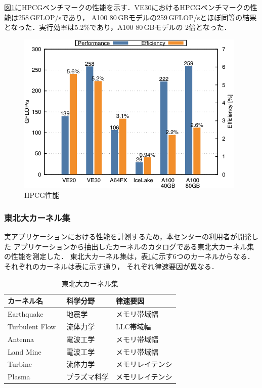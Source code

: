 ﻿\documentclass[submit,techrep,noauthor]{ipsj}
\begin{document}
図\ref{fig:hpcg}にHPCGベンチマークの性能を示す．VE30におけるHPCGベンチマークの性能は258\,GFLOP/sであり，
A100 80\,GBモデルの259\,GFLOP/sとほぼ同等の結果となった．実行効率は5.2\%であり，A100 80\,GBモデルの
2倍となった．

\begin{figure}[tb]
  \centering
  \includegraphics{figs/hpcg.pdf}
  \caption{HPCG性能~\cite{Takahashi2023}}\label{fig:hpcg}
\end{figure}

\subsubsection{東北大カーネル集}

実アプリケーションにおける性能を計測するため，本センターの利用者が開発した
アプリケーションから抽出したカーネルのカタログである東北大カーネル集の性能を測定した．
東北大カーネル集は，表\ref{tbl:isc-kernels}に示す6つのカーネルからなる．それぞれのカーネルは表に示す通り，
それぞれ律速要因が異なる．

\begin{table}[tb]
\caption{東北大カーネル集}\label{tbl:isc-kernels}
\begin{tabular}{@{}lll@{}}
\toprule
カーネル名                          & 科学分野        & 律速要因            \\ \midrule
Earthquake~\cite{Ariyoshi2007}      & 地震学          & メモリ帯域幅        \\
Turbulent Flow~\cite{Tsukahara2007} & 流体力学        & LLC帯域幅           \\
Antenna~\cite{Sato2011}             & 電波工学        & メモリ帯域幅        \\
Land Mine~\cite{Sato2003}           & 電波工学        & メモリ帯域幅        \\
Turbine~\cite{Tsukahara2007}        & 流体力学        & メモリレイテンシ    \\
Plasma~\cite{Katoh2005}             & プラズマ科学    & メモリレイテンシ    \\ \bottomrule
\end{tabular}
\end{table}
\end{document}

